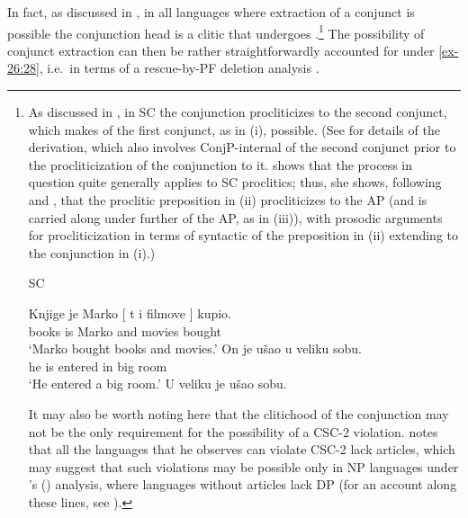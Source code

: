 \documentclass[output=paper]{langsci/langscibook}
\begin{document}
In fact, as discussed in \textcite{Oda:2017}, in all languages where
extraction of a conjunct is possible the conjunction head is a clitic that
undergoes .\footnote{As discussed in \textcite{Stjepanovic2014}, in
    \gls{SC} the conjunction procliticizes to the second conjunct, which makes
     of the first conjunct, as in (i), possible. (See
    \citealt{Stjepanovic2014} for details of the derivation, which also
    involves ConjP-internal  of the second conjunct prior to the
    procliticization of the conjunction to it. \citeauthor{Stjepanovic2014}
    shows that the process in question quite generally applies to \gls{SC}
    proclitics; thus, she shows, following \citealt{Boskovic2013b} and
    \citealt{Talic2014}, that the proclitic preposition in (ii) procliticizes
    to the AP (and is carried along under further  of the AP, as in
    (iii)), with  prosodic arguments for procliticization in
    terms of syntactic  of the preposition in (ii) extending to the
    conjunction in (i).)

\begin{exe}
 \glsdesc{SC}
    \begin{xlist}
	\ex\gll {}Knjige je Marko [ t i filmove ] kupio.\\
            books is Marko {} {} and movies {} bought\\
	\glt    \enquote*{Marko bought books and movies.}
	\ex\gll On  je  ušao  u  veliku  sobu.\\
			he is entered in big room\\
	\glt \enquote*{He entered a big room.}
	\ex U veliku je ušao sobu.
    \end{xlist}
\end{exe}

It may also be worth noting here that the clitichood of the conjunction may not
be the only requirement for the possibility of a CSC-2 violation.
\citeauthor{Oda:2017} notes that all the languages that he observes can
violate CSC-2 lack articles, which may suggest that such violations may be
possible only in NP languages under \citeauthor{Boskovic2008}’s
(\citeyear{Boskovic2008,Boskovic2012}) analysis, where languages without
articles lack DP (for an account along these lines, see
\citealt{Boskovic2017}).\label{fn:24}} The possibility of conjunct extraction
can then be rather straightforwardly accounted for under \eqref{ex-26:28}, i.e.\ in terms
of a rescue-by-\gls{PF} deletion analysis
\parencite[see][]{Oda:2017,Stjepanovic2014}.
\end{document}
